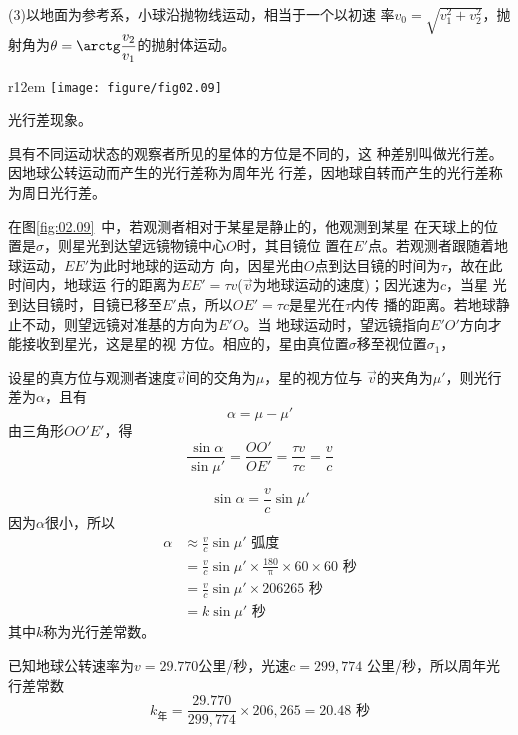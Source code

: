 \documentclass[../outline-of-mechanics.tex]{subfiles}
\begin{document}
(3)以地面为参考系，小球沿抛物线运动，相当于一个以初速
率$\displaystyle v_0=\sqrt{v_1^2+v_2^2}$，抛射角为$\theta=\arctg\dfrac{v_2}{v_1}$的抛射体运动。

\begin{wrapfigure}[9]{r}{12em}
  \vspace{1em}
  \centering
  \texttt{[image: figure/fig02.09]}
  \caption{}
  \label{fig:02.09}
\end{wrapfigure}
\example 光行差现象。

具有不同运动状态的观察者所见的星体的方位是不同的，这
种差别叫做光行差。因地球公转运动而产生的光行差称为周年光
行差，因地球自转而产生的光行差称为周日光行差。

在图\ref{fig:02.09}~中，若观测者相对于某星是静止的，他观测到某星
在天球上的位置是$\sigma$，则星光到达望远镜物镜中心$O$时，其目镜位
置在$E'$点。若观测者跟随着地球运动，$EE'$为此时地球的运动方
向，因星光由$O$点到达目镜的时间为$\tau$，故在此时间内，地球运
行的距离为$EE'=\tau v$($\vec{v}$为地球运动的速度)；因光速为$c$，当星
光到达目镜时，目镜已移至$E'$点，所以$OE'=\tau c$是星光在$\tau$内传
播的距离。若地球静止不动，则望远镜对准基的方向为$E'O$。当
地球运动时，望远镜指向$E'O'$方向才能接收到星光，这是星的视
方位。相应的，星由真位置$\sigma$移至视位置$\sigma_1$，

设星的真方位与观测者速度$\vec{v}$间的交角为$\mu$，星的视方位与
$\vec{v}$的夹角为$\mu'$，则光行差为$\alpha$，且有
\begin{equation*}
  \alpha=\mu-\mu'
\end{equation*}
由三角形$OO'E'$，得
\begin{equation*}
  \frac{\sin\alpha}{\sin\mu'}=\frac{OO'}{OE'}=\frac{\tau v}{\tau c}=\frac{v}{c}
\end{equation*}

\clearpage
\begin{equation*}
  \sin\alpha=\frac{v}{c}\sin\mu'
\end{equation*}
因为$\alpha$很小，所以
\begin{align*}
  \alpha & \approx\frac{v}{c}\sin\mu'\text{ 弧度}                                     \\
         & =\frac{v}{c}\sin\mu'\times\frac{180}{\uppi}\times 60 \times 60 \text{ 秒} \\
         & =\frac{v}{c}\sin\mu'\times 206265\text{ 秒}                               \\
         & =k\sin\mu'\text{ 秒}
\end{align*}
其中$k$称为光行差常数。

已知地球公转速率为$v=29.770$公里/秒，光速$c=299,774$
公里/秒，所以周年光行差常数
\begin{equation*}
  k_\text{年}=\frac{29.770}{299,774}\times 206,265=20.48\text{ 秒}
\end{equation*}
\end{document}
